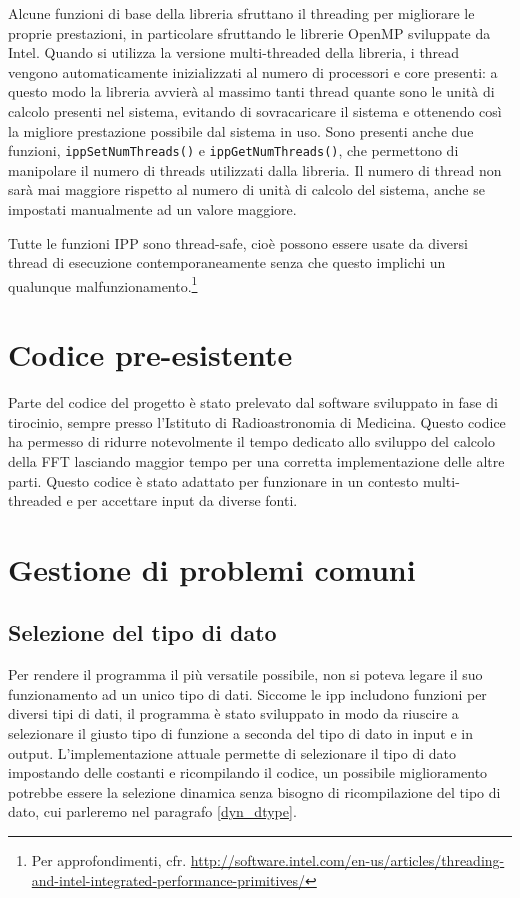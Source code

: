 Alcune funzioni di base della libreria sfruttano il threading per migliorare le
proprie prestazioni, in particolare sfruttando le librerie OpenMP sviluppate da
Intel. Quando si utilizza la versione multi-threaded della libreria, i thread
vengono automaticamente inizializzati al numero di processori e core presenti: a
questo modo la libreria avvier\`a al massimo tanti thread quante sono le unit\`a
di calcolo presenti nel sistema, evitando di sovracaricare il sistema e
ottenendo cos\`i la migliore prestazione possibile dal sistema in uso. Sono
presenti anche due funzioni, \texttt{ippSetNumThreads()} e
\texttt{ippGetNumThreads()}, che permettono di manipolare il numero di threads
utilizzati dalla libreria. Il numero di thread non sar\`a mai maggiore rispetto
al numero di unit\`a di calcolo del sistema, anche se impostati manualmente ad
un valore maggiore.

Tutte le funzioni IPP sono thread-safe, cio\`e possono essere usate da diversi
thread di esecuzione contemporaneamente senza che questo implichi un qualunque
malfunzionamento.\footnote{Per approfondimenti, cfr.
\url{http://software.intel.com/en-us/articles/threading-and-intel-integrated-performance-primitives/}}


\section{Codice pre-esistente}
Parte del codice del progetto \`e stato prelevato dal software sviluppato in
fase di tirocinio, sempre presso l'Istituto di Radioastronomia di Medicina.
Questo codice ha permesso di ridurre notevolmente il tempo dedicato allo
sviluppo del calcolo della \ac{FFT} lasciando maggior tempo per una corretta
implementazione delle altre parti. Questo codice \`e stato adattato per
funzionare in un contesto multi-threaded e per accettare input da diverse fonti.

\section{Gestione di problemi comuni}
\subsection{Selezione del tipo di dato}
Per rendere il programma il pi\`u versatile possibile, non si poteva legare il
suo funzionamento ad un unico tipo di dati. Siccome le \ac{ipp} includono
funzioni per diversi tipi di dati, il programma \`e stato sviluppato in modo da
riuscire a selezionare il giusto tipo di funzione a seconda del tipo di dato in
input e in output. L'implementazione attuale permette di selezionare il tipo di
dato impostando delle costanti e ricompilando il codice, un possibile
miglioramento potrebbe essere la selezione dinamica senza bisogno di
ricompilazione del tipo di dato, cui parleremo nel paragrafo \ref{dyn_dtype}.

